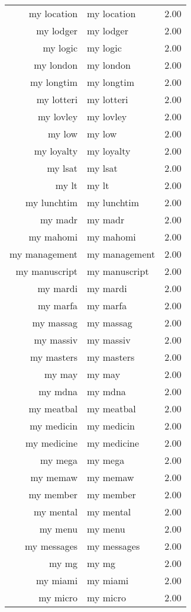 \begin{table}[ht]
\begin{tabular}{rlr}
  my location & my location & 2.00 \\ 
  my lodger & my lodger & 2.00 \\ 
  my logic & my logic & 2.00 \\ 
  my london & my london & 2.00 \\ 
  my longtim & my longtim & 2.00 \\ 
  my lotteri & my lotteri & 2.00 \\ 
  my lovley & my lovley & 2.00 \\ 
  my low & my low & 2.00 \\ 
  my loyalty & my loyalty & 2.00 \\ 
  my lsat & my lsat & 2.00 \\ 
  my lt & my lt & 2.00 \\ 
  my lunchtim & my lunchtim & 2.00 \\ 
  my madr & my madr & 2.00 \\ 
  my mahomi & my mahomi & 2.00 \\ 
  my management & my management & 2.00 \\ 
  my manuscript & my manuscript & 2.00 \\ 
  my mardi & my mardi & 2.00 \\ 
  my marfa & my marfa & 2.00 \\ 
  my massag & my massag & 2.00 \\ 
  my massiv & my massiv & 2.00 \\ 
  my masters & my masters & 2.00 \\ 
  my may & my may & 2.00 \\ 
  my mdna & my mdna & 2.00 \\ 
  my meatbal & my meatbal & 2.00 \\ 
  my medicin & my medicin & 2.00 \\ 
  my medicine & my medicine & 2.00 \\ 
  my mega & my mega & 2.00 \\ 
  my memaw & my memaw & 2.00 \\ 
  my member & my member & 2.00 \\ 
  my mental & my mental & 2.00 \\ 
  my menu & my menu & 2.00 \\ 
  my messages & my messages & 2.00 \\ 
  my mg & my mg & 2.00 \\ 
  my miami & my miami & 2.00 \\ 
  my micro & my micro & 2.00 \\ 

\end{tabular}
\end{table}
